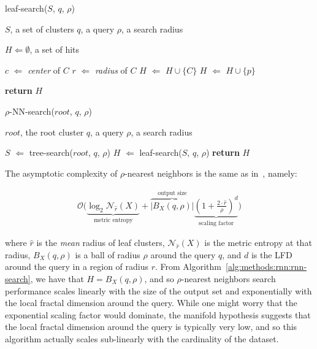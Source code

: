 \begin{algorithm} 
    \caption{leaf-search($S$, $q$, $\rho$)} 
    \label{alg:methods:rnn:leaf-search} 
    \begin{algorithmic}
        \REQUIRE $S$, a set of clusters
        \REQUIRE $q$, a query
        \REQUIRE $\rho$, a search radius

        \STATE $H \Leftarrow \emptyset$, a set of hits

            \STATE $c$ $\Leftarrow$ \emph{center} of $C$
            \STATE $r$ $\Leftarrow$ \emph{radius} of $C$
                \STATE $H$ $\Leftarrow$ $H \cup \{C\}$
            \ELSE
                        \STATE $H$ $\Leftarrow$ $H \cup \{p\}$
                    \ENDIF
                \ENDFOR
            \ENDIF
        \ENDFOR

        \STATE \textbf{return} $H$
    \end{algorithmic}
\end{algorithm}

\begin{algorithm} 
    \caption{$\rho$-NN-search($root$, $q$, $\rho$)} 
    \label{alg:methods:rnn:rnn-search} 
    \begin{algorithmic}
        \REQUIRE $root$, the root cluster
        \REQUIRE $q$, a query
        \REQUIRE $\rho$, a search radius

        \STATE $S$ $\Leftarrow$ tree-search($root$, $q$, $\rho$)
        \STATE $H$ $\Leftarrow$ leaf-search($S$, $q$, $\rho$)
        \STATE \textbf{return} $H$
    \end{algorithmic}
\end{algorithm}

The asymptotic complexity of $\rho$-nearest neighbors is the same as in~\cite{ishaq2019clustered}, namely:

\begin{gather}
    \mathcal{O}
    \Bigg(
        \underbrace{\log_2 \mathcal{N}_{\hat{r}}(X)}_{\textrm{metric entropy}} +
        \overbrace{ \left| B_X(q, \rho) \right|}^{\textrm{output size}}
        \underbrace{ \left( 1 + \frac{2 \cdot \hat{r}}{ \rho} \right) ^ d}_{\textrm{scaling factor}}
    \Bigg)
    \label{eq:methods:rnn:complexity}
\end{gather}

where $\hat{r}$ is the \textit{mean} radius of leaf clusters, $\mathcal{N}_{\hat{r}}(X)$ is the metric entropy at that radius, $B_X(q, \rho)$ is a ball of radius $\rho$ around the query $q$, and $d$ is the LFD around the query in a region of radius $r$.
From Algorithm~\ref{alg:methods:rnn:rnn-search}, we have that $H = B_X(q, \rho)$, and so $\rho$-nearest neighbors search performance scales linearly with the size of the output set and exponentially with the local fractal dimension around the query.
While one might worry that the exponential scaling factor would dominate, the manifold hypothesis suggests that the local fractal dimension around the query is typically very low, and so this algorithm actually scales sub-linearly with the cardinality of the dataset.



